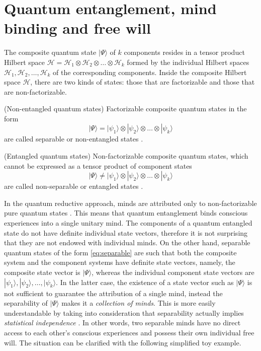 \documentclass{ws-ijmpb}
\begin{document}
\section{Quantum entanglement, mind binding and free will}
\label{S7}

The composite quantum state $|\Psi\rangle$ of $k$ components resides
in a tensor product Hilbert space $\mathcal{H}=\mathcal{H}_{1}\otimes\mathcal{H}_{2}\otimes\ldots\otimes\mathcal{H}_{k}$
formed by the individual Hilbert spaces $\mathcal{H}_{1},\mathcal{H}_{2},\ldots,\mathcal{H}_{k}$
of the corresponding components. Inside the composite Hilbert space
$\mathcal{H}$, there are two kinds of states: those that are factorizable
and those that are non-factorizable.

\begin{definition}
(Non-entangled quantum states) Factorizable composite quantum states in the form
\begin{equation}
|\Psi\rangle=|\psi_{1}\rangle\otimes|\psi_{2}\rangle\otimes\ldots\otimes|\psi_{k}\rangle\label{eq:separable}
\end{equation}
are called separable or non-entangled states \cite{Gudder2020a,Gudder2020b}.
\end{definition}

\begin{definition}
(Entangled quantum states) Non-factorizable composite quantum states,
which cannot be expressed as a tensor product of component states
\begin{equation}
|\Psi\rangle\neq|\psi_{1}\rangle\otimes|\psi_{2}\rangle\otimes\ldots\otimes|\psi_{k}\rangle
\end{equation}
are called non-separable or entangled states \cite{Georgiev2022b,Georgiev2022c}.
\end{definition}

In the quantum reductive approach, minds are attributed only to non-factorizable
pure quantum states \cite{Georgiev2017}. This means that quantum
entanglement binds conscious experiences into a single unitary mind.
The components of a quantum entangled state do not have definite individual
state vectors, therefore it is not surprising that they are not endowed
with individual minds. On the other hand, separable quantum states
of the form \eqref{eq:separable} are such that both the composite
system and the component systems have definite state vectors, namely,
the composite state vector is $|\Psi\rangle$, whereas the individual
component state vectors are $|\psi_{1}\rangle,|\psi_{2}\rangle,\ldots,|\psi_{k}\rangle$.
In the latter case, the existence of a state vector such as $|\Psi\rangle$
is not sufficient to guarantee the attribution of a single mind, instead
the separability of $|\Psi\rangle$ makes it a \emph{collection of
minds}. This is more easily understandable by taking into consideration
that separability actually implies \emph{statistical independence} \cite{Georgiev2021b}.
In other words, two separable minds have no direct access to each other's conscious experiences
and possess their own individual free will. The situation can be clarified
with the following simplified toy example.
\end{document}
